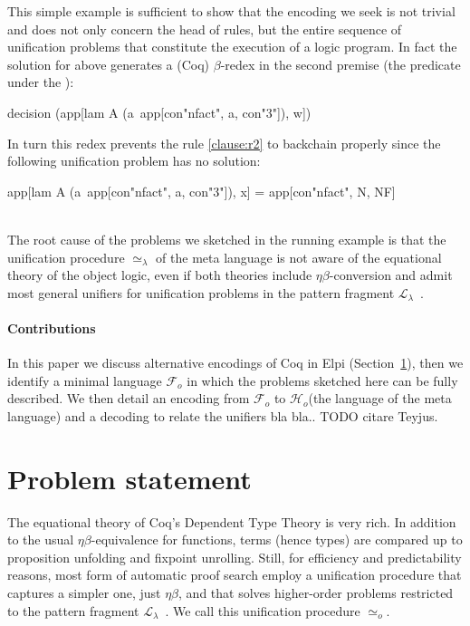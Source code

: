 \documentclass[sigconf,natbib=false]{acmart}
\newcommand{\UnifRel}{\ensuremath{\simeq}}
\newcommand{\Uo}{\ensuremath{\UnifRel_o}\xspace}
\newcommand{\Ue}{\ensuremath{\UnifRel_\lambda}\xspace}
\newcommand{\llambda}{\ensuremath{\mathcal{L}_\lambda}\xspace}
\newcommand{\Fo}{\ensuremath{\mathcal{F}_{\!o}\xspace}} %
\newcommand{\Ho}{\ensuremath{\mathcal{H}_o}\xspace}
\begin{document}
\noindent
This simple example is sufficient to show that the encoding we seek
is not trivial and does not only concern the head of rules, but the entire sequence
of unification problems that constitute the execution of a logic program.
In fact
the solution for  above generates a
(Coq) $\beta$-redex in the second premise (the predicate
under the \hspace{-0.4em}):

\begin{elpicode}
decision (app[lam A (a\ app[con"nfact", a, con"3"]), w])
\end{elpicode}

\noindent
In turn this redex prevents the rule \ref{clause:r2} to backchain properly since
the following unification problem has no solution:

\begin{elpicode}
app[lam A (a\ app[con"nfact", a, con"3"]), x] =
app[con"nfact", N, NF]
\end{elpicode}
\noindent
~\\
The root cause of the problems we sketched in the running example
is that the unification procedure \Ue of the meta language is not aware
of the equational theory of the object logic, even if both theories
include $\eta\beta$-conversion and admit most general
unifiers for unification problems in the pattern fragment \llambda~\cite{miller92jsc}.

\paragraph{Contributions}
In this paper we discuss alternative encodings of Coq in
Elpi (Section~\ref{sec:encodings}), then we identify a minimal language \Fo{}
in which the problems sketched here can be fully described.
We then detail an encoding  from \Fo{} to \Ho (the language of
the meta language) and a decoding  to relate the unifiers
bla bla.. TODO citare Teyjus.

\section{Problem statement} %
\label{sec:encodings}

The equational theory of Coq's Dependent Type Theory is very rich. In
addition to the usual $\eta\beta$-equivalence for functions, terms (hence types)
are compared up to proposition unfolding and fixpoint unrolling. Still,
for efficiency and predictability reasons, most form of automatic proof search
employ a unification procedure that captures a simpler one,
just $\eta\beta$, and that solves higher-order problems
restricted to the pattern fragment $\llambda$~\cite{miller92jsc}.
We call this unification procedure \Uo{}.
\end{document}
